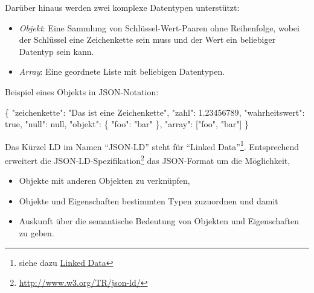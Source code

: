 \documentclass[,a4paper]{article}
\newenvironment{Shaded}{}{}
\newcommand{\DataTypeTok}[1]{\textcolor[rgb]{0.56,0.13,0.00}{{#1}}}
\newcommand{\DecValTok}[1]{\textcolor[rgb]{0.25,0.63,0.44}{{#1}}}
\newcommand{\FloatTok}[1]{\textcolor[rgb]{0.25,0.63,0.44}{{#1}}}
\newcommand{\StringTok}[1]{\textcolor[rgb]{0.25,0.44,0.63}{{#1}}}
\newcommand{\NormalTok}[1]{{#1}}
\begin{document}
Darüber hinaus werden zwei komplexe Datentypen unterstützt:

\begin{itemize}
\itemsep1pt\parskip0pt
\item
  \emph{Objekt}: Eine Sammlung von Schlüssel-Wert-Paaren ohne
  Reihenfolge, wobei der Schlüssel eine Zeichenkette sein muss und der
  Wert ein beliebiger Datentyp sein kann.
\item
  \emph{Array}: Eine geordnete Liste mit beliebigen Datentypen.
\end{itemize}

Beispiel eines Objekts in JSON-Notation:

\begin{Shaded}
\begin{Highlighting}[]
\NormalTok{\{}
    \DataTypeTok{"zeichenkette"}\NormalTok{: }\StringTok{"Das ist eine Zeichenkette"}\NormalTok{,}
    \DataTypeTok{"zahl"}\NormalTok{: }\FloatTok{1.23456789}\NormalTok{,}
    \DataTypeTok{"wahrheitswert"}\NormalTok{: }\DecValTok{true}\NormalTok{,}
    \DataTypeTok{"null"}\NormalTok{: }\DecValTok{null}\NormalTok{,}
    \DataTypeTok{"objekt"}\NormalTok{: \{}
        \DataTypeTok{"foo"}\NormalTok{: }\StringTok{"bar"}
    \NormalTok{\},}
    \DataTypeTok{"array"}\NormalTok{: [}\StringTok{"foo"}\NormalTok{, }\StringTok{"bar"}\NormalTok{]}
\NormalTok{\}}
\end{Highlighting}
\end{Shaded}


Das Kürzel LD im Namen ``JSON-LD'' steht für ``Linked Data''\footnote{siehe
  dazu \hyperref[linkedux5fdata]{Linked Data}}. Entsprechend erweitert
die JSON-LD-Spezifikation\footnote{\url{http://www.w3.org/TR/json-ld/}}
das JSON-Format um die Möglichkeit,

\begin{itemize}
\itemsep1pt\parskip0pt
\item
  Objekte mit anderen Objekten zu verknüpfen,
\item
  Objekte und Eigenschaften bestimmten Typen zuzuordnen und damit
\item
  Auskunft über die semantische Bedeutung von Objekten und Eigenschaften
  zu geben.
\end{itemize}
\end{document}
